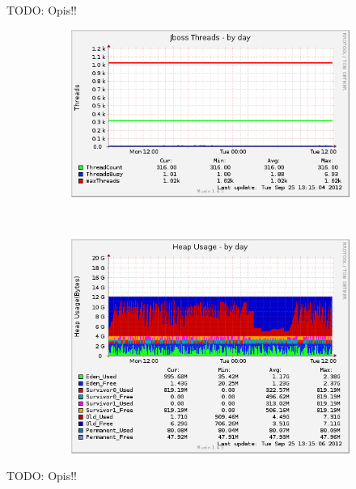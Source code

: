 \documentclass[10pt,a4paper]{article}
\newcommand{\todo}[1]{\noindent\colorbox{myRed}{TODO: #1}}
\begin{document}
\todo{Opis!!}

\begin{figure}
        \centering
        \begin{subfigure}[b]{0.49\textwidth}
                \centering
                \includegraphics[width=\textwidth]{jboss_threads-day}
                \label{fig:jboss_threads-day}
        \end{subfigure}%
        ~ %
        \begin{subfigure}[b]{0.49\textwidth}
                \centering
                \includegraphics[width=\textwidth]{jstat__heap-day}
                \label{fig:jstat__heap-day}
        \end{subfigure}
        
        \label{fig:animals}
\end{figure}

\todo{Opis!!}




\end{document}
